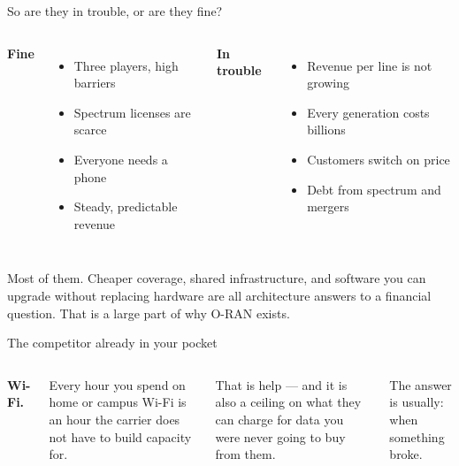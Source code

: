 \begin{frame}{So are they in trouble, or are they fine?}
  \begin{columns}[T,onlytextwidth]
      \large\textbf{\textcolor{softgreen}{Fine}}

      \vspace{0.5em}
      \small
      \begin{itemize}\itemsep5pt
        \item Three players, high barriers
        \item Spectrum licenses are scarce
        \item Everyone needs a phone
        \item Steady, predictable revenue
      \end{itemize}
      \large\textbf{\textcolor{coreorange}{In trouble}}

      \vspace{0.5em}
      \small
      \begin{itemize}\itemsep5pt
        \item Revenue per line is not growing
        \item Every generation costs billions
        \item Customers switch on price
        \item Debt from spectrum and mergers
      \end{itemize}
  \end{columns}

  \vspace{0.9em}
     {Most of them. Cheaper coverage, shared infrastructure, and software you can
      upgrade without replacing hardware are all architecture answers to a
      financial question. That is a large part of why O-RAN exists.}
\end{frame}

\begin{frame}{The competitor already in your pocket}
  \begin{columns}[T,onlytextwidth]
      \large\textbf{Wi-Fi.}

      \vspace{0.6em}
      \small
      Every hour you spend on home or campus Wi-Fi is an hour the carrier
      does not have to build capacity for.

      \vspace{0.6em}
      That is help --- and it is also a ceiling on what they can charge for
      data you were never going to buy from them.
      \vspace{0.4em}

      \vspace{0.6em}
      {\small The answer is usually: when something broke.\par}
  \end{columns}

  \vspace{0.7em}
\end{frame}

